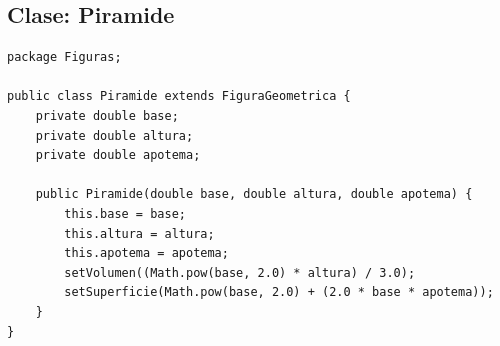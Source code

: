 \documentclass[12pt,a4paper]{article}
\begin{document}
\subsection*{Clase: Piramide}
\begin{lstlisting}[caption={Clase Piramide.java}]
package Figuras;

public class Piramide extends FiguraGeometrica {
    private double base;
    private double altura;
    private double apotema;

    public Piramide(double base, double altura, double apotema) {
        this.base = base;
        this.altura = altura;
        this.apotema = apotema;
        setVolumen((Math.pow(base, 2.0) * altura) / 3.0);
        setSuperficie(Math.pow(base, 2.0) + (2.0 * base * apotema));
    }
}
\end{lstlisting}
\end{document}
